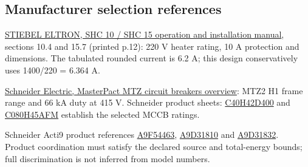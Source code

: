 \subsection*{Manufacturer selection references}
\href{https://www.stiebel-eltron.com/content/dam/ste/cdbassets/current/bedienungs-_u_installationsanleitungen/instructionandinstallationmanual_doc-00060782.pdf}{STIEBEL ELTRON, SHC 10 / SHC 15 operation and installation manual}, sections 10.4 and 15.7 (printed p.12): 220 V heater rating, 10 A protection and dimensions. The tabulated rounded current is 6.2 A; this design conservatively uses 1400/220 = 6.364 A.

\href{https://ckm-content.se.com/ckmContent/sfc/servlet.shepherd/document/download/0691H00000FWgC6QAL}{Schneider Electric, MasterPact MTZ circuit breakers overview}: MTZ2 H1 frame range and 66 kA duty at 415 V. Schneider product sheets: \href{https://www.se.com/nl/nl/product/C40H42D400/compact-vermogenschakelaar-nsx400h-70ka-ac-4p4d-400a-2-3/}{C40H42D400} and \href{https://www.se.com/uk/en/product/C080H45AFM/circuit-breaker-compact-ns800h-70ka-at-415vac-4p-fixed-manually-operated-micrologic-5-0a-control-unit-800a/}{C080H45AFM} establish the selected MCCB ratings.

Schneider Acti9 product references \href{https://eshop.se.com/ae/acti9-ic60h-4p-63a-c-miniature-circuit-breaker-a9f54463.html}{A9F54463}, \href{https://www.se.com/uk/en/product/A9D31810/ic60h-earth-leakage-circuit-breaker-1p-\%2B-n-b-curve-10-a-30-ma-240-v/}{A9D31810} and \href{https://www.se.com/uk/en/product/A9D31832/ic60h-earth-leakage-circuit-breaker-1p-\%2B-n-b-curve-32-a-30-ma-240-v/}{A9D31832}. Product coordination must satisfy the declared source and total-energy bounds; full discrimination is not inferred from model numbers.
